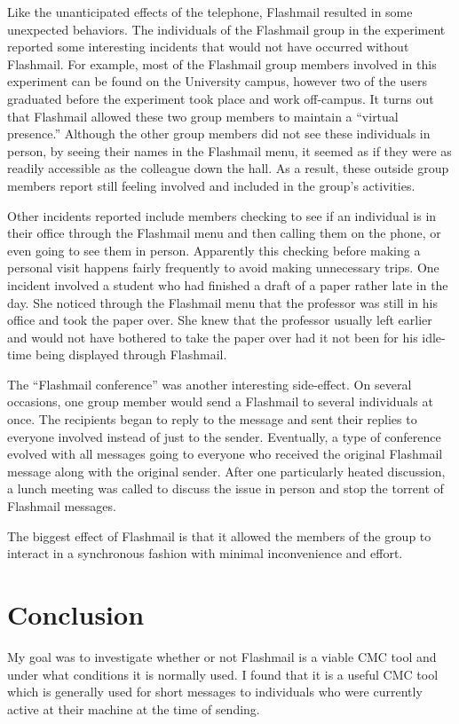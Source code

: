 Like the unanticipated effects of the telephone, Flashmail resulted in some
unexpected behaviors.  The individuals of the Flashmail group in the
experiment reported some interesting incidents that would not have occurred
without Flashmail.  For example, most of the Flashmail group members
involved in this experiment can be found on the University campus, however
two of the users graduated before the experiment took place and work
off-campus. It turns
out that Flashmail allowed these two group members to maintain a ``virtual
presence.''  Although the other group members did not see these individuals
in person, by seeing their names in the Flashmail menu, it seemed as if
they were as readily accessible as the colleague down the hall.  As a
result, these outside group members report still feeling involved and
included in the group's activities.

Other incidents reported include members checking to see if an individual
is in their office through the Flashmail menu and then calling them on the
phone, or even going to see them in person.  Apparently this checking
before making a personal visit happens fairly frequently to avoid making
unnecessary trips.  One incident involved a student who had finished a
draft of a paper rather late in the day.  She noticed through the Flashmail
menu that the professor was still in his office and took the paper over.
She knew that the professor usually left earlier and would not have
bothered to take the paper over had it not been for his idle-time being
displayed through Flashmail.

The ``Flashmail conference'' was another interesting side-effect.  On
several occasions, one group member would send a Flashmail to several 
individuals at once.  The recipients began to reply to the message and
sent their replies to everyone involved instead of just to the sender.
Eventually, a type of conference evolved with all messages going to
everyone who received the original Flashmail message along with the
original sender.  After one particularly heated discussion, a lunch meeting
was called to discuss the issue in person and stop the torrent of Flashmail
messages. 

The biggest effect of Flashmail is that it allowed the members of the group
to interact in a synchronous fashion with minimal inconvenience and effort.

\section{Conclusion}
My goal was to investigate whether or not Flashmail is a viable CMC tool
and under what conditions it is normally used.  I found that it is a useful
CMC tool which is generally used for short messages to individuals who were
currently active at their machine at the time of sending.


